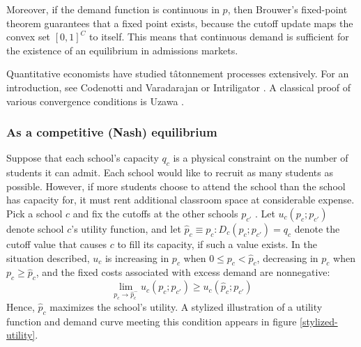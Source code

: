 \documentclass[12pt]{article}
\theoremstyle{definition}
\begin{document}
Moreover, if the demand function is continuous in $p$, then Brouwer's fixed-point theorem guarantees that a fixed point exists, because the cutoff update maps the convex set $[0, 1]^C$ to itself. This means that continuous demand is sufficient for the existence of an equilibrium in admissions markets. 

Quantitative economists have studied t\^{a}tonnement processes extensively. For an introduction, see Codenotti and Varadarajan \parencite*{compmkteq} or Intriligator \parencite*[][chap. 9]{mathematicaloptandecontheory}. A classical proof of various convergence conditions is Uzawa \parencite*{walrastatonnement}. 

\subsubsection{As a competitive (Nash) equilibrium} \label{asacompeq}
Suppose that each school's capacity $q_c$ is a physical constraint on the number of students it can admit. Each school would like to recruit as many students as possible. However, if more students choose to attend the school than the school has capacity for, it must rent additional classroom space at considerable expense. Pick a school $c$ and fix the cutoffs at the other schools $p_{c'}$ . Let $u_c(p_c; p_{c'})$ denote school $c$'s utility function, and let $\hat p_c \equiv p_c: D_c(p_c; p_{c'}) = q_c$ denote the cutoff value that causes $c$ to fill its capacity, if such a value exists. In the situation described, $u_c$ is increasing in $p_c$ when $0 \leq p_c < \hat p_c$, decreasing in $p_c$ when $p_c \geq \hat p_c$, and the fixed costs associated with excess demand are nonnegative: \[\lim_{p_c \to \hat p_c^-} u_c(p_c; p_{c'}) \geq u_c(\hat p_c; p_{c'})\]
Hence, $\hat p_c$ maximizes the school's utility. A stylized illustration of a utility function and demand curve meeting this condition appears in figure \ref{stylized-utility}. 
\end{document}
